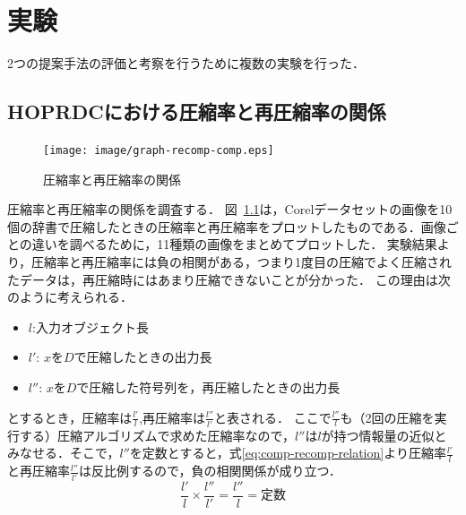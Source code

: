 \chapter{実験}
2つの提案手法の評価と考察を行うために複数の実験を行った．

\section{HOPRDCにおける圧縮率と再圧縮率の関係} %
\label{sec:hoprdcにおける圧縮率と再圧縮率の関係}
\begin{figure}[tb]
\begin{center}
\texttt{[image: image/graph-recomp-comp.eps]}
\caption{圧縮率と再圧縮率の関係}
\label{fig:image/graph-recomp-comp}
\end{center}
\end{figure}



圧縮率と再圧縮率の関係を調査する．
図~\ref{fig:image/graph-recomp-comp}は，Corelデータセットの画像を10個の辞書で圧縮したときの圧縮率と再圧縮率をプロットしたものである．画像ごとの違いを調べるために，11種類の画像をまとめてプロットした．
実験結果より，圧縮率と再圧縮率には負の相関がある，つまり1度目の圧縮でよく圧縮されたデータは，再圧縮時にはあまり圧縮できないことが分かった．
この理由は次のように考えられる．
\begin{itemize}
	\item $l $:入力オブジェクト長
	\item $l'$: $x$を$D$で圧縮したときの出力長
	\item $l''$: $x$を$D$で圧縮した符号列を，再圧縮したときの出力長
\end{itemize}
とするとき，圧縮率は$\frac{l'}{l}$,再圧縮率は$\frac{l''}{l'}$と表される．
ここで$\frac{l''}{l}$も（2回の圧縮を実行する）圧縮アルゴリズムで求めた圧縮率なので，$l''$は$l$が持つ情報量の近似とみなせる．そこで，$l''$を定数とすると，式\ref{eq:comp-recomp-relation}より圧縮率$\frac{l'}{l}$と再圧縮率$\frac{l''}{l'}$は反比例するので，負の相関関係が成り立つ．
\begin{equation}
\label{eq:comp-recomp-relation}
\frac{l'}{l}\times \frac{l''}{l'} = \frac{l''}{l} = 定数
\end{equation}


